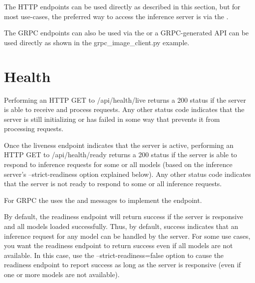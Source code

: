 \documentclass[letterpaper,10pt,english]{sphinxmanual}
\begin{document}
The HTTP endpoints can be used directly as described in this section,
but for most use-cases, the preferred way to access the inference
server is via the {\hyperref[\detokenize{client:section-client-libraries-and-examples}]{}}.

The GRPC endpoints can also be used via the {\hyperref[\detokenize{client:section-client-libraries-and-examples}]{}} or a GRPC-generated
API can be used directly as shown in the grpc\_image\_client.py example.


\section{Health}
\label{\detokenize{http_grpc_api:health}}\label{\detokenize{http_grpc_api:section-api-health}}
Performing an HTTP GET to /api/health/live returns a 200 status if the
server is able to receive and process requests. Any other status code
indicates that the server is still initializing or has failed in some
way that prevents it from processing requests.

Once the liveness endpoint indicates that the server is active,
performing an HTTP GET to /api/health/ready returns a 200 status if
the server is able to respond to inference requests for some or all
models (based on the inference server’s --strict-readiness option
explained below). Any other status code indicates that the server is
not ready to respond to some or all inference requests.

For GRPC the  uses the
 and
messages to implement the endpoint.

By default, the readiness endpoint will return success if the server
is responsive and all models loaded successfully. Thus, by default,
success indicates that an inference request for any model can be
handled by the server. For some use cases, you want the readiness
endpoint to return success even if all models are not available. In
this case, use the --strict-readiness=false option to cause the
readiness endpoint to report success as long as the server is
responsive (even if one or more models are not available).
\end{document}
